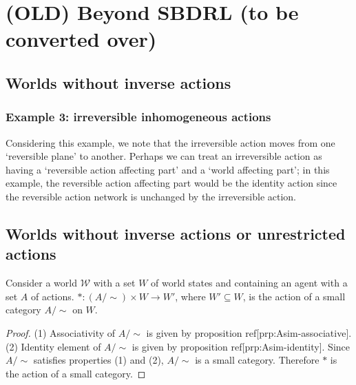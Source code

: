 \chapter{(OLD) Beyond SBDRL (to be converted over)}
\section{Worlds without inverse actions}

\subsection{Example 3: irreversible inhomogeneous actions}

\begin{remark}
    Considering this example, we note that the irreversible action moves from one `reversible plane' to another.
    Perhaps we can treat an irreversible action as having a `reversible action affecting part' and a `world affecting part'; in this example, the reversible action affecting part would be the identity action since the reversible action network is unchanged by the irreversible action.
\end{remark}

\section{Worlds without inverse actions or unrestricted actions}\label{sec:Worlds without inverse actions or unrestricted actions}

\begin{proposition}\label{prp:all_worlds_give_small_category_action}
    Consider a world $\mathscr{W}$ with a set $W$ of world states and containing an agent with a set $A$ of actions.
    $*: (A/\sim) \times W \to W'$, where $W' \subseteq W$, is the action of a small category $A/\sim$ on $W$.
\end{proposition}
\begin{proof}
    (1) Associativity of $A/\sim$ is given by proposition ref[prp:Asim-associative].
    (2) Identity element of $A/\sim$ is given by proposition ref[prp:Asim-identity].
    Since $A/\sim$ satisfies properties (1) and (2), $A/\sim$ is a small category.
    Therefore $*$ is the action of a small category.
\end{proof}

